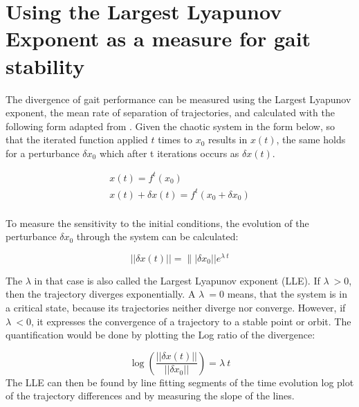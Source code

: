 \documentclass[main]{subfiles}
\begin{document}
\chapter{Using the Largest Lyapunov Exponent as a measure for gait stability} %

\label{AppendixA} %

The divergence of gait performance can be measured using the Largest Lyapunov exponent, the mean rate of separation of trajectories, and calculated with the following form adapted from \cite{bib:Rosenstein1993}. %
%
Given the chaotic system in the form below, so that the iterated function applied \(t\) times to \(x_0\) results in \(x(t)\), the same holds for a perturbance \(\delta x_0\) which after t iterations occurs as \(\delta x(t)\).

\begin{align*}
x(t) = f^t(x_0)\\
x(t) + \delta x(t) = f^t(x_0 + \delta x_0)\\
\end{align*}

To measure the sensitivity to the initial conditions, the evolution of the perturbance \(\delta x_0\) through the system can be calculated:

\[||\delta x(t)|| = \||\delta x_0|| e^{\lambda\ t}\]

The \(\lambda\) in that case is also called the Largest Lyapunov exponent (LLE). %
%
If \(\lambda\ > 0\), then the trajectory diverges exponentially. %
%
A \(\lambda\ = 0\) means, that the system is in a critical state, because its trajectories neither diverge nor converge. %
%
However, if \(\lambda\ < 0\), it expresses the convergence of a trajectory to a stable point or orbit. %
%
The quantification would be done by plotting the Log ratio of the divergence:

\[\log\left(\frac{||\delta x(t)||}{||\delta x_0||}\right) = \lambda\ t\]
%
The LLE can then be found by line fitting segments of the time evolution log plot of the trajectory differences and by measuring the slope of the lines. %
\end{document}
